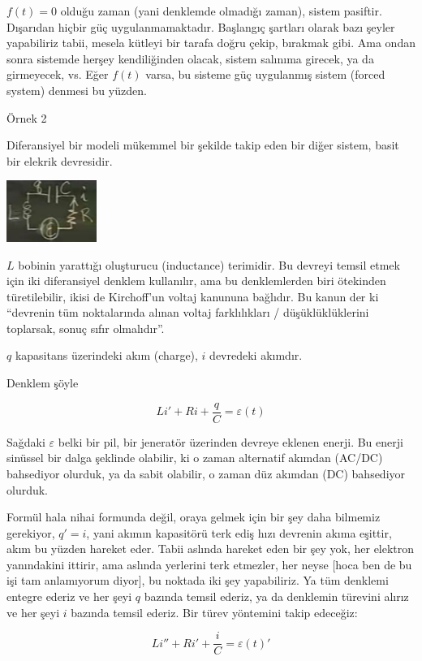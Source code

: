 \documentclass[12pt,fleqn]{article}\usepackage{../../common}
\begin{document}
$f(t)=0$ olduğu zaman (yani denklemde olmadığı zaman), sistem
pasiftir. Dışarıdan hiçbir güç uygulanmamaktadır. Başlangıç şartları olarak bazı
şeyler yapabiliriz tabii, mesela kütleyi bir tarafa doğru çekip, bırakmak
gibi. Ama ondan sonra sistemde herşey kendiliğinden olacak, sistem salınıma
girecek, ya da girmeyecek, vs. Eğer $f(t)$ varsa, bu sisteme güç uygulanmış
sistem (forced system) denmesi bu yüzden.

Örnek 2

Diferansiyel bir modeli mükemmel bir şekilde takip eden bir diğer sistem, basit
bir elekrik devresidir.

\includegraphics[height=2cm]{12_2.png}

$L$ bobinin yarattığı oluşturucu (inductance) terimidir. Bu devreyi temsil etmek
için iki diferansiyel denklem kullanılır, ama bu denklemlerden biri ötekinden
türetilebilir, ikisi de Kirchoff'un voltaj kanununa bağlıdır. Bu kanun der ki
``devrenin tüm noktalarında alınan voltaj farklılıkları / düşüklüklüklerini
toplarsak, sonuç sıfır olmalıdır''.

$q$ kapasitans üzerindeki akım (charge), $i$ devredeki akımdır.

Denklem şöyle

$$ Li' + Ri + \frac{q}{C} = \varepsilon(t) $$

Sağdaki $\varepsilon$ belki bir pil, bir jeneratör üzerinden devreye eklenen
enerji. Bu enerji sinüssel bir dalga şeklinde olabilir, ki o zaman alternatif
akımdan (AC/DC) bahsediyor olurduk, ya da sabit olabilir, o zaman düz akımdan
(DC) bahsediyor olurduk.

Formül hala nihai formunda değil, oraya gelmek için bir şey daha bilmemiz
gerekiyor, $q' = i$, yani akımın kapasitörü terk ediş hızı devrenin akıma
eşittir, akım bu yüzden hareket eder. Tabii aslında hareket eden bir şey yok,
her elektron yanındakini ittirir, ama aslında yerlerini terk etmezler, her neyse
[hoca ben de bu işi tam anlamıyorum diyor], bu noktada iki şey yapabiliriz. Ya
tüm denklemi entegre ederiz ve her şeyi $q$ bazında temsil ederiz, ya da
denklemin türevini alırız ve her şeyi $i$ bazında temsil ederiz. Bir türev
yöntemini takip edeceğiz:

$$ Li'' + Ri' + \frac{i}{C} = \varepsilon(t)'$$
\end{document}
